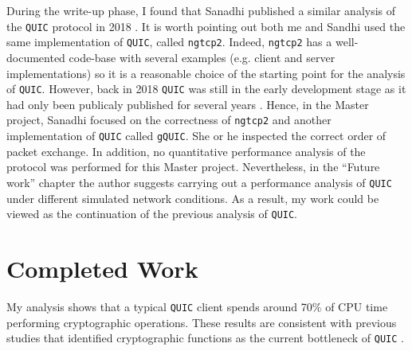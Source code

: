 \documentclass[12pt,a4paper,twoside,openright]{report}
\begin{document}
During the write-up phase, I found that Sanadhi published a similar analysis of the \texttt{QUIC} protocol in 2018 \cite{overview_of_the_QUIC_protocol}.
It is worth pointing out both me and Sandhi used the same implementation of \texttt{QUIC}, called \texttt{ngtcp2}.
Indeed, \texttt{ngtcp2} has a well-documented code-base with several examples (e.g. client and server implementations) so it is a reasonable choice of the starting point for the analysis of \texttt{QUIC}.   
However, back in 2018 \texttt{QUIC} was still in the early development stage as it had only been publicaly published for several years \cite{Chromium_Blog_Experimenting_with_quic}.
Hence, in the Master project, Sanadhi focused on the correctness of \texttt{ngtcp2} and another implementation of \texttt{QUIC} called \texttt{gQUIC}.
She or he inspected the correct order of packet exchange.
In addition, no quantitative performance analysis of the protocol was performed for this Master project. 
Nevertheless, in the \enquote{Future work} chapter the author suggests carrying out a performance analysis of \texttt{QUIC} under different simulated network conditions.
As a result, my work could be viewed as the continuation of the previous analysis of \texttt{QUIC}.







\section{Completed Work}
My analysis shows that a typical \texttt{QUIC} client spends around 70\% of CPU time performing cryptographic operations. 
These results are consistent with previous studies that identified cryptographic functions as the current bottleneck of \texttt{QUIC} \cite{Making_QUIC_Quicker}.







\end{document}
